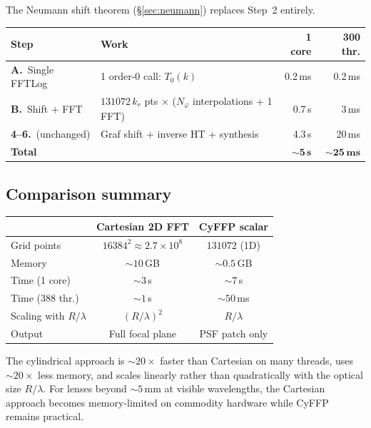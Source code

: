 \documentclass[11pt,a4paper]{article}
\begin{document}
The Neumann shift theorem (\S\ref{sec:neumann}) replaces Step~2 entirely.

\begin{center}
\begin{tabular}{@{}l p{6cm} r r@{}}
\toprule
\textbf{Step} & \textbf{Work} & \textbf{1 core} & \textbf{300 thr.}\\
\midrule
\textbf{A.}\ Single FFTLog
  & 1 order-0 call: $T_0(k)$
  & 0.2\,ms & 0.2\,ms \\[4pt]
\textbf{B.}\ Shift + FFT
  & $131072\,k_r$ pts $\times$ ($N_\varphi$ interpolations + 1 FFT)
  & 0.7\,s & 3\,ms \\[4pt]
\textbf{4--6.}\ (unchanged)
  & Graf shift + inverse HT + synthesis
  & 4.3\,s & 20\,ms \\[4pt]
\midrule
\textbf{Total} & & ${\sim}\mathbf{5\,s}$ & ${\sim}\mathbf{25\,ms}$ \\
\bottomrule
\end{tabular}
\end{center}

\subsection{Comparison summary}

\begin{center}
\begin{tabular}{@{}lcc@{}}
\toprule
& \textbf{Cartesian 2D FFT} & \textbf{CyFFP scalar} \\
\midrule
Grid points     & $16384^2 \approx 2.7\times 10^8$ & $131072$ (1D) \\
Memory          & ${\sim}10$\,GB        & ${\sim}0.5$\,GB \\
Time (1 core)   & ${\sim}3$\,s          & ${\sim}7$\,s \\
Time (388 thr.) & ${\sim}1$\,s          & ${\sim}50$\,ms \\
Scaling with $R/\lambda$ & $(R/\lambda)^2$ & $R/\lambda$ \\
Output          & Full focal plane      & PSF patch only \\
\bottomrule
\end{tabular}
\end{center}

\noindent
The cylindrical approach is ${\sim}20\times$ faster than Cartesian on many threads,
uses ${\sim}20\times$ less memory, and scales linearly rather than quadratically
with the optical size $R/\lambda$.  For lenses beyond ${\sim}5$\,mm at visible
wavelengths, the Cartesian approach becomes memory-limited on commodity hardware
while CyFFP remains practical.
\end{document}
